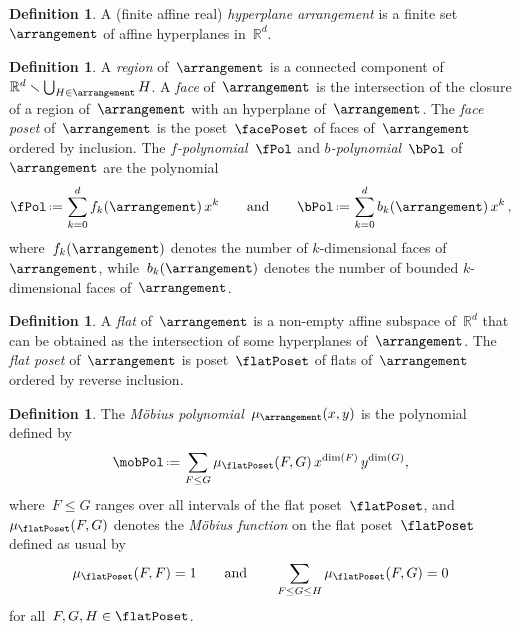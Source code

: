 \documentclass{amsart}
\newcommand{\darkblue}{\color{darkblue}} %
\theoremstyle{definition}
\newtheorem{definition}[theorem]{Definition}
\newcommand{\R}{\mathbb{R}} %
\newcommand{\ssm}{\smallsetminus} %
\newcommand{\eqdef}{\mbox{\,\raisebox{0.2ex}{\scriptsize\ensuremath{\mathrm:}}\ensuremath{=}\,}} %
\newcommand{\defn}[1]{\textsl{\darkblue #1}} %
\begin{document}
\begin{definition}
A (finite affine real) \defn{hyperplane arrangement} is a finite set~$\arrangement$ of affine hyperplanes in~$\R^d$.
\end{definition}

\begin{definition}
A \defn{region} of~$\arrangement$ is a connected component of~$\R^d \ssm \bigcup_{H \in \arrangement} H$.
A \defn{face} of~$\arrangement$ is the intersection of the closure of a region of~$\arrangement$ with an hyperplane of~$\arrangement$.
The \defn{face poset} of~$\arrangement$ is the poset~$\facePoset$ of faces of~$\arrangement$ ordered by inclusion.
The \defn{$f$-polynomial}~$\fPol$ and \defn{$b$-polynomial}~$\bPol$ of~$\arrangement$ are the polynomial
\[
\fPol \eqdef \sum_{k = 0}^d f_k(\arrangement) \, x^k
\qquad\text{and}\qquad
\bPol \eqdef \sum_{k = 0}^d b_k(\arrangement) \, x^k \, ,
\]
where~$f_k(\arrangement)$ denotes the number of $k$-dimensional faces of~$\arrangement$, while~$b_k(\arrangement)$ denotes the number of bounded $k$-dimensional faces of~$\arrangement$.
\end{definition}

\begin{definition}
A \defn{flat} of~$\arrangement$ is a non-empty affine subspace of~$\R^d$ that can be obtained as the intersection of some hyperplanes of~$\arrangement$.
The \defn{flat poset} of~$\arrangement$ is poset~$\flatPoset$ of flats of~$\arrangement$ ordered by reverse inclusion.
\end{definition}

\begin{definition}
\label{def:MobiusPolynomial}
The \defn{M\"obius polynomial}~$\mu_{\arrangement}(x,y)$ is the polynomial defined by
\[
\mobPol \eqdef \sum_{F \le G} \mu_{\flatPoset}(F,G) \, x^{\dim(F)} \, y^{\dim(G)},
\]
where~$F \le G$ ranges over all intervals of the flat poset~$\flatPoset$, and~$\mu_{\flatPoset}(F,G)$ denotes the \defn{M\"obius function} on the flat poset~$\flatPoset$ defined as usual by
\[
\mu_{\flatPoset}(F, F) = 1
\qquad\text{and}\qquad
\sum_{F \le G \le H} \mu_{\flatPoset}(F,G) = 0
\]
for all~$F, G, H \in \flatPoset$.
\end{definition}
\end{document}
